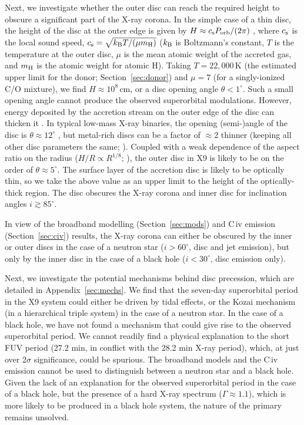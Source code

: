 \documentclass[a4paper,fleqn,usenatbib]{mnras}
\begin{document}
Next, we investigate whether the outer disc can reach the required height to obscure a significant part of the X-ray corona. In the simple case of a thin disc, the height of the disc at the outer edge is given by $H \approx c_{\rm s} P_{\rm orb} / (2 \pi)$ \citep{2002apa..book.....F}, where $c_{\rm s}$ is the local sound speed, $c_{\rm s} = \sqrt{k_{\rm B} T / (\mu m_{\rm H})}$ ($k_{\rm B}$ is Boltzmann's constant, $T$ is the temperature at the outer disc, $\mu$ is the mean atomic weight of the accreted gas, and $m_{\rm H}$ is the atomic weight for atomic H). Taking $T = 22,000$\,K (the estimated upper limit for the donor; Section~\ref{sec:donor}) and $\mu = 7$ (for a singly-ionized C/O mixture), we find $H \approx 10^8$\,cm, or a disc opening angle $\theta < 1^\circ$. Such a small opening angle cannot produce the observed superorbital modulations. However, energy deposited by the accretion stream on the outer edge of the disc can thicken it \citep{1982ApJ...257..318W}. In typical low-mass X-ray binaries, the opening (semi-)angle of the disc is $\theta \approx 12^\circ$ \citep{1996A&A...314..484D}, but metal-rich discs can be a factor of $\approx$2 thinner (keeping all other disc parameters the same; \citealp{2006AstL...32..257D}). Coupled with a weak dependence of the aspect ratio on the radius ($H/R \propto R^{1/8}$; \citealp{2002apa..book.....F}), the outer disc in X9 is likely to be on the order of $\theta \approx 5^\circ$. The surface layer of the accretion disc is likely to be optically thin, so we take the above value as an upper limit to the height of the optically-thick region. The disc obscures the X-ray corona and inner disc for inclination angles $i \gtrsim 85^\circ$.

In view of the broadband modelling (Section~\ref{sec:mods}) and C\,{\sc iv} emission (Section~\ref{sec:civ}) results, the X-ray corona can either be obscured by the inner or outer discs in the case of a neutron star ($i > 60^\circ$, disc and jet emission), but only by the inner disc in the case of a black hole ($i < 30^\circ$, disc emission only).

Next, we investigate the potential mechanisms behind disc precession, which are detailed in Appendix~\ref{sec:mechs}. We find that the seven-day superorbital period in the X9 system could either be driven by tidal effects, or the Kozai mechanism (in a hierarchical triple system) in the case of a neutron star. In the case of a black hole, we have not found a mechanism that could give rise to the observed superorbital period. We cannot readily find a physical explanation to the short FUV period (27.2 min, in conflict with the 28.2 min X-ray period), which, at just over 2$\sigma$ significance, could be spurious. The broadband models and the C\,{\sc iv} emission cannot be used to distinguish between a neutron star and a black hole. Given the lack of an explanation for the observed superorbital period in the case of a black hole, but the presence of a hard X-ray spectrum ($\Gamma \approx 1.1$), which is more likely to be produced in a black hole system, the nature of the primary remains unsolved.
\end{document}
